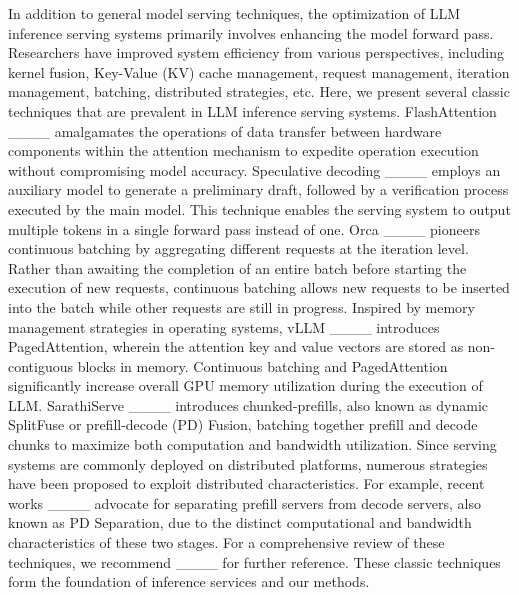 
In addition to general model serving techniques, the optimization of LLM inference serving systems primarily involves enhancing the model forward pass. Researchers have improved system efficiency from various perspectives, including kernel fusion, Key-Value (KV) cache management, request management, iteration management, batching, distributed strategies, etc. Here, we present several classic techniques that are prevalent in LLM inference serving systems. FlashAttention ____ amalgamates the operations of data transfer between hardware components within the attention mechanism to expedite operation execution without compromising model accuracy. Speculative decoding ____ employs an auxiliary model to generate a preliminary draft, followed by a verification process executed by the main model. This technique enables the serving system to output multiple tokens in a single forward pass instead of one. Orca ____ pioneers continuous batching by aggregating different requests at the iteration level. Rather than awaiting the completion of an entire batch before starting the execution of new requests, continuous batching allows new requests to be inserted into the batch while other requests are still in progress. Inspired by memory management strategies in operating systems, vLLM ____ introduces PagedAttention, wherein the attention key and value vectors are stored as non-contiguous blocks in memory. Continuous batching and PagedAttention significantly increase overall GPU memory utilization during the execution of LLM. SarathiServe ____ introduces chunked-prefills, also known as dynamic SplitFuse or prefill-decode (PD) Fusion, batching together prefill and decode chunks to maximize both computation and bandwidth utilization. Since serving systems are commonly deployed on distributed platforms, numerous strategies have been proposed to exploit distributed characteristics. For example, recent works ____ advocate for separating prefill servers from decode servers, also known as PD Separation, due to the distinct computational and bandwidth characteristics of these two stages. For a comprehensive review of these techniques, we recommend ____ for further reference.
These classic techniques form the foundation of inference services and our methods. 

